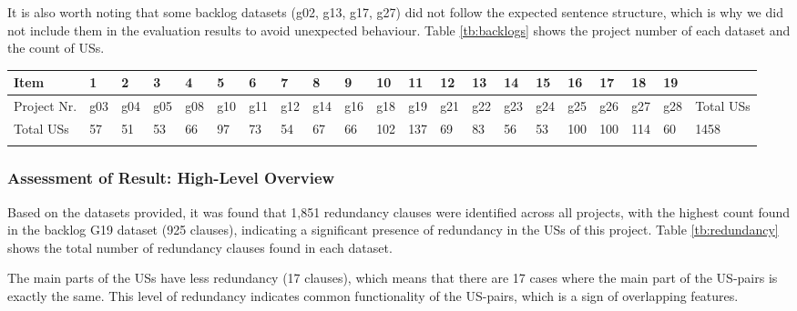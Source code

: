 It is also worth noting that some backlog datasets (g02, g13, g17, g27) did not follow the expected sentence structure, which is why we did not include them in the evaluation results to avoid unexpected behaviour. Table \ref{tb:backlogs} shows the project number of each dataset and the count of USs.

\begingroup
\centering
\scriptsize
\renewcommand{\arraystretch}{1.5} 
\begin{tabularx}{\linewidth}{l|XXXXXXXXXXXXXXXXXXX|X}
	Item&	1&	2&	3&	4&	5&	6&	7&	8&	9&	10&	11&	12&	13&	14&	15&	16&	17&	18&	19&	\\
	\hline
	Project Nr.&	g03	&g04	&g05	&g08	&g10	&g11	&g12	&g14	&g16	&g18	&g19	&g21	&g22	&g23	&g24	&g25	&g26	&g27	&g28	&Total USs\\
	\hline
	Total USs&	57&	51	&53	&66	&97	&73	&54	&67	&66	&102	&137	&69	&83	&56	&53	&100	&100	&114	&60	&1458 \\
	\caption{Project number and count of USs contained in each backlog dataset}\label{tb:backlogs}
\end{tabularx}	
\endgroup
\subsubsection*{Assessment of Result: High-Level Overview}
Based on the datasets provided, it was found that 1,851 redundancy clauses were identified across all projects, with the highest count found in the backlog G19 dataset (925 clauses), indicating a significant presence of redundancy in the USs of this project. Table \ref{tb:redundancy} shows the total number of redundancy clauses found in each dataset.

The main parts of the USs have less redundancy (17 clauses), which means that there are 17 cases where the main part of the US-pairs is exactly the same. This level of redundancy indicates common functionality of the US-pairs, which is a sign of overlapping features. 

